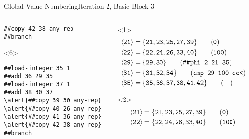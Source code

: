 \documentclass{beamer}
\newcommand{\vn}[1]{\ensuremath{\langle\texttt{#1}\rangle}}
\newcommand{\vreg}[1]{\texttt{#1}}
\begin{document}
\begin{frame}[fragile]{Global Value Numbering}{Iteration 2, Basic Block 3}
\begin{columns}[t,onlytextwidth]
\begin{column}[t]{.5\textwidth}
\begin{onlyenv}
\begin{Verbatim}[frame=single,commandchars=\\\{\}]
##copy 42 38 any-rep
##branch
        \end{Verbatim}
      \end{onlyenv}
      \begin{onlyenv}<6>
        \begin{Verbatim}[frame=single,commandchars=\\\{\}]
##load-integer 35 1
##add 36 29 35
##load-integer 37 1
##add 38 30 37
\alert{##copy 39 30 any-rep}
\alert{##copy 40 26 any-rep}
\alert{##copy 41 36 any-rep}
\alert{##copy 42 38 any-rep}
##branch
        \end{Verbatim}
      \end{onlyenv}
    \end{column}
    \begin{column}{.5\textwidth}
      \begin{onlyenv}<1>
        \begin{align*}
          \vn{21} &= \{\vreg{21},
                       \vreg{23},
                       \vreg{25},
                       \vreg{27},
                       \vreg{39}\} \tag{\texttt{0}} \\
          \vn{22} &= \{\vreg{22},
                       \vreg{24},
                       \vreg{26},
                       \vreg{33},
                       \vreg{40}\} \tag{\texttt{100}} \\
          \vn{29} &= \{\vreg{29},
                       \vreg{30}\} \tag{\texttt{\#\#phi 2 21 35}} \\
          \vn{31} &= \{\vreg{31},
                       \vreg{32},
                       \vreg{34}\} \tag{\texttt{cmp 29 100 cc<}} \\
          \vn{35} &= \{\vreg{35},
                       \vreg{36},
                       \vreg{37},
                       \vreg{38},
                       \vreg{41},
                       \vreg{42}\} \tag{---}
        \end{align*}
      \end{onlyenv}
      \begin{onlyenv}<2>
        \begin{align*}
          \vn{21} &= \{\vreg{21},
                       \vreg{23},
                       \vreg{25},
                       \vreg{27},
                       \vreg{39}\} \tag{\texttt{0}} \\
          \vn{22} &= \{\vreg{22},
                       \vreg{24},
                       \vreg{26},
                       \vreg{33},
                       \vreg{40}\} \tag{\texttt{100}} \\

\end{align*}
\end{onlyenv}
\end{column}
\end{columns}
\end{frame}
\end{document}
